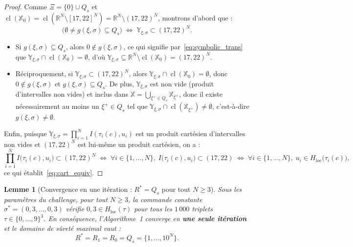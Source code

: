 \documentclass[11pt,a4paper]{article}
\theoremstyle{definition}
\theoremstyle{plain}
\newtheorem{lemme}{Lemme}
\newcommand{\R}{\mathbb{R}}
\newcommand{\X}{\mathbb{X}}
\newcommand{\cl}{\operatorname{cl}}
\begin{document}
\begin{proof}
Comme $\Xi = \{0\} \cup Q_s$ et $\cl(\X_0) = \cl(\R^N \setminus [17, 22]^N) = \R^N \setminus (17, 22)^N$, montrons d'abord que :
\[
  \bigl(\emptyset \neq g(\xi, \sigma) \subseteq Q_s\bigr)
  \;\Longleftrightarrow\;
  \mathbb{Y}_{\xi, \sigma} \subset (17, 22)^N.
\]
\begin{itemize}[leftmargin=1.5em]
  \item[$(\Rightarrow)$] Si $g(\xi, \sigma) \subseteq Q_s$, alors $0 \notin g(\xi, \sigma)$, ce qui signifie par~\eqref{eq:symbolic_trans} que $\mathbb{Y}_{\xi, \sigma} \cap \cl(\X_0) = \emptyset$, d'où $\mathbb{Y}_{\xi, \sigma} \subseteq \R^N \setminus \cl(\X_0) = (17, 22)^N$.
  \item[$(\Leftarrow)$] Réciproquement, si $\mathbb{Y}_{\xi, \sigma} \subset (17, 22)^N$, alors $\mathbb{Y}_{\xi, \sigma} \cap \cl(\X_0) = \emptyset$, donc $0 \notin g(\xi, \sigma)$ et $g(\xi, \sigma) \subseteq Q_s$. De plus, $\mathbb{Y}_{\xi, \sigma}$ est non vide (produit d'intervalles non vides) et inclus dans $\X = \bigcup_{\xi^+ \in Q_s} \X_{\xi^+}$, donc il existe nécessairement au moins un $\xi^+ \in Q_s$ tel que $\mathbb{Y}_{\xi, \sigma} \cap \cl(\X_{\xi^+}) \neq \emptyset$, c'est-à-dire $g(\xi, \sigma) \neq \emptyset$.
\end{itemize}

\noindent Enfin, puisque $\mathbb{Y}_{\xi, \sigma} = \prod_{i=1}^N I(\tau_i(c), u_i)$ est un produit cartésien d'intervalles non vides et $(17, 22)^N$ est lui-même un produit cartésien, on a :
\[
  \prod_{i=1}^{N} I\bigl(\tau_i(c), u_i\bigr) \subset (17, 22)^N
  \;\Longleftrightarrow\;
  \forall i \in \{1, \dots, N\},\; I\bigl(\tau_i(c), u_i\bigr) \subset (17, 22)
  \;\Longleftrightarrow\;
  \forall i \in \{1, \dots, N\},\; u_i \in H_{\mathrm{loc}}\bigl(\tau_i(c)\bigr),
\]
ce qui établit~\eqref{eq:cart_equiv}.
\end{proof}

\begin{lemme}[Convergence en une itération : $R^* = Q_s$ pour tout $N \ge 3$]
\label{lem:full_invariance}
Sous les paramètres du challenge, pour tout $N \ge 3$, la commande constante $\sigma^* = (0{,}3, \dots, 0{,}3)$ vérifie $0{,}3 \in H_{\mathrm{loc}}(\tau)$ pour tous les $1\,000$ triplets $\tau \in \{0, \dots, 9\}^3$. En conséquence, l'Algorithme~1 converge en \textbf{une seule itération} et le domaine de sûreté maximal vaut :
\begin{equation}
  R^* = R_1 = R_0 = Q_s = \{1, \dots, 10^N\}.
  \label{eq:r_star_full}
\end{equation}
\end{lemme}
\end{document}
